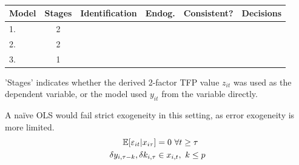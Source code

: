 \begin{table}[htbp]
    \begin{center}
        \begin{threeparttable}
            \caption{}
            \label{table:model-summary}
            \begin{tabular}{lcllcl}
                \toprule\toprule
                Model
                & Stages                             
                & Identification
                & Endog.
                & Consistent?
                & Decisions
                \\
                \hline
                1. \nameref{ss:model-lmm}
                & 2                                     \\
                2. \nameref{ss:model-dd}
                & 2                                     \\
                3. \nameref{s:model-dynamic-panel}
                & 1                                     \\
                \bottomrule
            \end{tabular}
            \begin{tablenotes}
                \item 'Stages' indicates whether the derived 2-factor TFP value $z_{it}$
                was used as the dependent variable, or the model used $y_{it}$ from the  variable directly.
            \end{tablenotes}
        \end{threeparttable}
    \end{center}
\end{table}

A naïve OLS would fail strict exogeneity in this setting, as error exogeneity is more limited.
\begin{align}
    \mathbb E[\varepsilon_{it}|x_{i\tau}] &=0\ \forall t\geq \tau
    \\
    \notag
    \delta y_{i,\tau-k}, \delta k_{i,\tau} &\in x_{i,t},\ k\leq p
\end{align}



